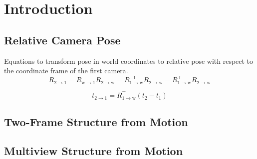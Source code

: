 \chapter{Introduction}

	\section{Relative Camera Pose}
		Equations to transform pose in world coordinates to relative pose with respect to the coordinate frame of the first camera.
		\begin{equation}
			R_{2 \rightarrow 1} = R_{\text{w} \rightarrow 1} R_{2 \rightarrow \text{w}}
								= R_{1 \rightarrow \text{w}}^{-1} R_{2 \rightarrow \text{w}}
								= R_{1 \rightarrow \text{w}}^{\top} R_{2 \rightarrow \text{w}}
		\end{equation}
		
		\begin{equation}
			t_{2 \rightarrow 1} = R_{1 \rightarrow \text{w}}^{\top} (t_2 - t_1)
		\end{equation}

	\section{Two-Frame Structure from Motion}
	
	\section{Multiview Structure from Motion}